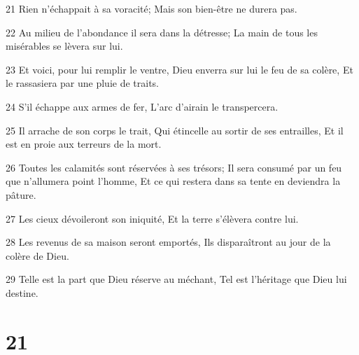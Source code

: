 \par 21 Rien n'échappait à sa voracité; Mais son bien-être ne durera pas.
\par 22 Au milieu de l'abondance il sera dans la détresse; La main de tous les misérables se lèvera sur lui.
\par 23 Et voici, pour lui remplir le ventre, Dieu enverra sur lui le feu de sa colère, Et le rassasiera par une pluie de traits.
\par 24 S'il échappe aux armes de fer, L'arc d'airain le transpercera.
\par 25 Il arrache de son corps le trait, Qui étincelle au sortir de ses entrailles, Et il est en proie aux terreurs de la mort.
\par 26 Toutes les calamités sont réservées à ses trésors; Il sera consumé par un feu que n'allumera point l'homme, Et ce qui restera dans sa tente en deviendra la pâture.
\par 27 Les cieux dévoileront son iniquité, Et la terre s'élèvera contre lui.
\par 28 Les revenus de sa maison seront emportés, Ils disparaîtront au jour de la colère de Dieu.
\par 29 Telle est la part que Dieu réserve au méchant, Tel est l'héritage que Dieu lui destine.

\chapter{21}

